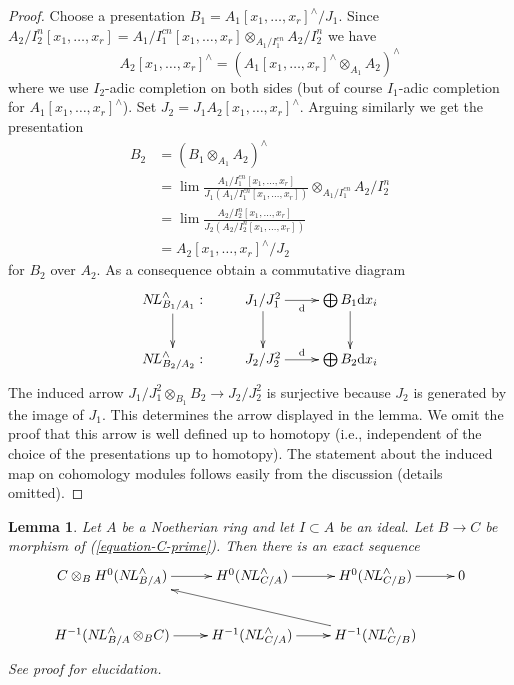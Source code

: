 \documentclass{stacks-project}
\theoremstyle{plain}
\newtheorem{lemma}[subsection]{Lemma}
\theoremstyle{definition}
\theoremstyle{remark}
\numberwithin{equation}{subsection}
\def\lim{\mathop{\mathrm{lim}}\nolimits}
\def\NL{\mathop{N\!L}\nolimits}
\begin{document}
\begin{proof}
Choose a presentation $B_1 = A_1[x_1, \ldots, x_r]^\wedge/J_1$.
Since
$A_2/I_2^n[x_1, \ldots, x_r] =
A_1/I_1^{cn}[x_1, \ldots, x_r] \otimes_{A_1/I_1^{cn}} A_2/I_2^n$
we have
$$
A_2[x_1, \ldots, x_r]^\wedge =
(A_1[x_1, \ldots, x_r]^\wedge \otimes_{A_1} A_2)^\wedge
$$
where we use $I_2$-adic completion on both sides (but of course
$I_1$-adic completion for $A_1[x_1, \ldots, x_r]^\wedge$).
Set $J_2 = J_1 A_2[x_1, \ldots, x_r]^\wedge$. Arguing similarly
we get the presentation
\begin{align*}
B_2
& =
(B_1 \otimes_{A_1} A_2)^\wedge \\
& =
\lim \frac{A_1/I_1^{cn}[x_1, \ldots, x_r]}{J_1(A_1/I_1^{cn}[x_1, \ldots, x_r])}
\otimes_{A_1/I_1^{cn}} A_2/I_2^n \\
& =
\lim \frac{A_2/I_2^n[x_1, \ldots, x_r]}{J_2(A_2/I_2^n[x_1, \ldots, x_r])} \\
& =
A_2[x_1, \ldots, x_r]^\wedge/J_2
\end{align*}
for $B_2$ over $A_2$. As a consequence obtain a commutative diagram
$$
\xymatrix{
\NL^\wedge_{B_1/A_1} : \ar[d] &
J_1/J_1^2 \ar[r]_-{\text{d}} \ar[d] & \bigoplus B_1\text{d}x_i \ar[d] \\
\NL^\wedge_{B_2/A_2} : &
J_2/J_2^2 \ar[r]^-{\text{d}} & \bigoplus B_2\text{d}x_i
}
$$
The induced arrow $J_1/J_1^2 \otimes_{B_1} B_2 \to J_2/J_2^2$
is surjective because $J_2$ is generated by the image of $J_1$.
This determines the arrow displayed in the lemma. We omit the proof
that this arrow is well defined up to homotopy (i.e., independent
of the choice of the presentations up to homotopy). The statement
about the induced map on cohomology modules follows easily
from the discussion (details omitted).
\end{proof}

\begin{lemma}
\label{lemma-exact-sequence-NL}
Let $A$ be a Noetherian ring and let $I \subset A$ be an ideal.
Let $B \to C$ be morphism of (\ref{equation-C-prime}). Then
there is an exact sequence
$$
\xymatrix{
C \otimes_B H^0(\NL_{B/A}^\wedge) \ar[r] &
H^0(\NL_{C/A}^\wedge) \ar[r] &
H^0(\NL_{C/B}^\wedge) \ar[r] & 0 \\
H^{-1}(\NL_{B/A}^\wedge \otimes_B C) \ar[r] &
H^{-1}(\NL_{C/A}^\wedge) \ar[r] &
H^{-1}(\NL_{C/B}^\wedge) \ar[llu]
}
$$
See proof for elucidation.
\end{lemma}
\end{document}
